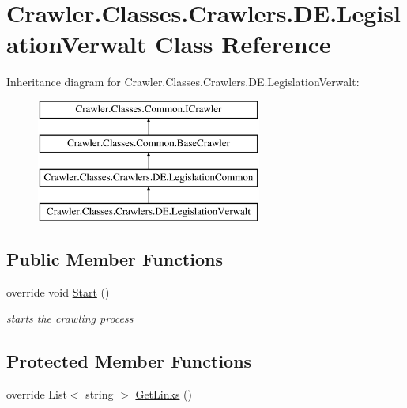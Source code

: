 \hypertarget{class_crawler_1_1_classes_1_1_crawlers_1_1_d_e_1_1_legislation_verwalt}{\section{Crawler.\-Classes.\-Crawlers.\-D\-E.\-Legislation\-Verwalt Class Reference}
\label{class_crawler_1_1_classes_1_1_crawlers_1_1_d_e_1_1_legislation_verwalt}
}
Inheritance diagram for Crawler.\-Classes.\-Crawlers.\-D\-E.\-Legislation\-Verwalt\-:\begin{figure}[H]
\begin{center}
\leavevmode
\includegraphics[height=4.000000cm]{class_crawler_1_1_classes_1_1_crawlers_1_1_d_e_1_1_legislation_verwalt}
\end{center}
\end{figure}
\subsection*{Public Member Functions}
\begin{DoxyCompactItemize}
\item 
override void \hyperlink{class_crawler_1_1_classes_1_1_crawlers_1_1_d_e_1_1_legislation_verwalt_a5b4d573f0bfeb2968a806f8342a17c64}{Start} ()
\begin{DoxyCompactList}\small\item\em starts the crawling process \end{DoxyCompactList}\end{DoxyCompactItemize}
\subsection*{Protected Member Functions}
\begin{DoxyCompactItemize}
\item 
override List$<$ string $>$ \hyperlink{class_crawler_1_1_classes_1_1_crawlers_1_1_d_e_1_1_legislation_verwalt_a73984548a81d6dc2ccef91c8dc50c8a4}{Get\-Links} ()
\end{DoxyCompactItemize}
